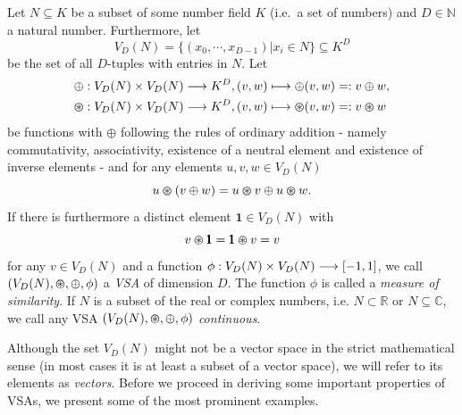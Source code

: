 \begin{defn}
	\label{def:VSA}
	Let $N \subseteq K$ be a subset of some number field $K$ (i.e.\ a set of numbers) and $D \in \mathbb{N}$ a natural number.
	Furthermore, let
	\[V_{D}(N)=\{\left(x_{0}, \cdots, x_{D-1}\right)  | x_{i} \in N\} \subseteq K^{D}\]
	be the set of all $D$-tuples with entries in $N$.
	Let
	\begin{align*}
		&\oplus: V_{D}(N) \times V_{D}(N) \longrightarrow K^{D}, (v,w) \longmapsto \oplus(v,w) =: v\oplus w, \\
		&\varoast: V_{D}(N) \times V_{D}(N) \longrightarrow K^{D}, (v,w) \longmapsto \varoast(v,w) =: v\varoast w
	\end{align*}
	be functions with $\oplus$ following the rules of ordinary addition - namely commutativity, associativity, existence of a neutral element and existence of inverse elements - and for any elements $u,v,w \in V_{D}(N)$
	\[u \varoast (v \oplus w) = u \varoast v \oplus u \varoast w.\]
	If there is furthermore a distinct element $\pmb{1} \in V_{D}(N)$ with
	\[v \varoast \pmb{1} = \pmb{1} \varoast v = v\]
	for any $v \in V_{D}(N)$ and a function $\phi: V_{D}(N) \times V_{D}(N) \longrightarrow \left[-1,1\right]$, we call $(V_{D}(N), \varoast, \oplus, \phi)$ a \emph{\acrfull{VSA}} of dimension $D$.
	The function $\phi$ is called a \emph{measure of similarity}.
	If $N$ is a subset of the real or complex numbers, i.e. $N \subset \mathbb{R}$ or $N \subseteq \mathbb{C}$, we call any \ac{VSA} $\left(V_{D}(N), \varoast, \oplus, \phi\right)$ \emph{continuous}.
\end{defn}
Although the set $V_{D}(N)$ might not be a vector space in the strict mathematical sense (in most cases it is at least a subset of a vector space), we will refer to its elements as \emph{vectors}.
Before we proceed in deriving some important properties of \acp{VSA}, we present some of the most prominent examples.

